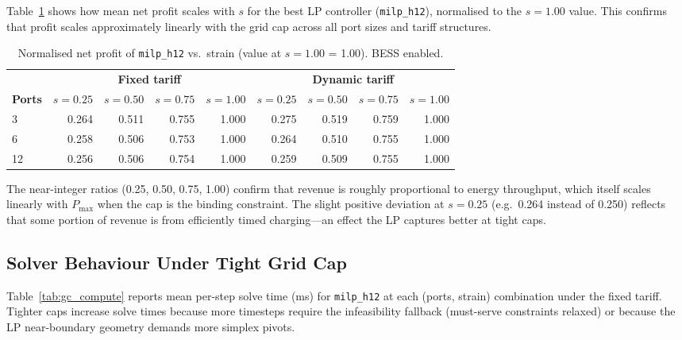 Table~\ref{tab:gc_profit_scaling} shows how mean net profit scales with $s$
for the best LP controller (\texttt{milp\_h12}), normalised to the $s=1.00$
value.  This confirms that profit scales approximately linearly with the grid
cap across all port sizes and tariff structures.

\begin{table}[!htb]
\centering
\caption{Normalised net profit of \texttt{milp\_h12} vs.\ strain
         (value at $s=1.00$ = 1.00). BESS enabled.}
\label{tab:gc_profit_scaling}
\begin{tabular}{l rrrr rrrr}
\toprule
 & \multicolumn{4}{c}{\textbf{Fixed tariff}} & \multicolumn{4}{c}{\textbf{Dynamic tariff}} \\
\cmidrule(lr){2-5}\cmidrule(lr){6-9}
\textbf{Ports} & $s=0.25$ & $s=0.50$ & $s=0.75$ & $s=1.00$
              & $s=0.25$ & $s=0.50$ & $s=0.75$ & $s=1.00$ \\
\midrule
3  & 0.264 & 0.511 & 0.755 & 1.000 & 0.275 & 0.519 & 0.759 & 1.000 \\
6  & 0.258 & 0.506 & 0.753 & 1.000 & 0.264 & 0.510 & 0.755 & 1.000 \\
12 & 0.256 & 0.506 & 0.754 & 1.000 & 0.259 & 0.509 & 0.755 & 1.000 \\
\bottomrule
\end{tabular}
\end{table}

The near-integer ratios (0.25, 0.50, 0.75, 1.00) confirm that revenue is
roughly proportional to energy throughput, which itself scales linearly with
$P_{\max}$ when the cap is the binding constraint.  The slight positive
deviation at $s=0.25$ (e.g.\ 0.264 instead of 0.250) reflects that some
portion of revenue is from efficiently timed charging—an effect the LP
captures better at tight caps.

\subsection{Solver Behaviour Under Tight Grid Cap}
\label{subsec:gc_compute}

Table~\ref{tab:gc_compute} reports mean per-step solve time (ms) for
\texttt{milp\_h12} at each (ports, strain) combination under the fixed
tariff.  Tighter caps increase solve times because more timesteps require the
infeasibility fallback (must-serve constraints relaxed) or because the LP
near-boundary geometry demands more simplex pivots.

